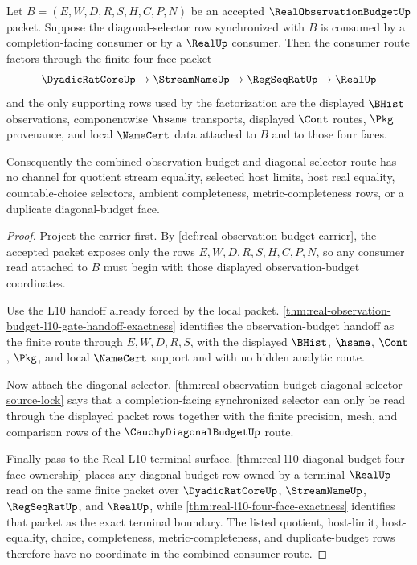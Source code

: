 \begin{theorem}
\label{thm:real-observation-budget-l10-four-face-pullback}
Let $B=(E,W,D,R,S,H,C,P,N)$ be an accepted $\RealObservationBudgetUp$ packet. Suppose the diagonal-selector row synchronized with $B$ is consumed by a completion-facing consumer or by a $\RealUp$ consumer. Then the consumer route factors through the finite four-face packet
$$
\DyadicRatCoreUp \to \StreamNameUp \to \RegSeqRatUp \to \RealUp
$$
and the only supporting rows used by the factorization are the displayed $\BHist$ observations, componentwise $\hsame$ transports, displayed $\Cont$ routes, $\Pkg$ provenance, and local $\NameCert$ data attached to $B$ and to those four faces.

Consequently the combined observation-budget and diagonal-selector route has no channel for quotient stream equality, selected host limits, host real equality, countable-choice selectors, ambient completeness, metric-completeness rows, or a duplicate diagonal-budget face.
\end{theorem}
\begin{proof}
Project the carrier first. By \autoref{def:real-observation-budget-carrier}, the accepted packet exposes only the rows $E,W,D,R,S,H,C,P,N$, so any consumer read attached to $B$ must begin with those displayed observation-budget coordinates.

Use the L10 handoff already forced by the local packet. \autoref{thm:real-observation-budget-l10-gate-handoff-exactness} identifies the observation-budget handoff as the finite route through $E,W,D,R,S$, with the displayed $\BHist$, $\hsame$, $\Cont$, $\Pkg$, and local $\NameCert$ support and with no hidden analytic route.

Now attach the diagonal selector. \autoref{thm:real-observation-budget-diagonal-selector-source-lock} says that a completion-facing synchronized selector can only be read through the displayed packet rows together with the finite precision, mesh, and comparison rows of the $\CauchyDiagonalBudgetUp$ route.

Finally pass to the Real L10 terminal surface. \autoref{thm:real-l10-diagonal-budget-four-face-ownership} places any diagonal-budget row owned by a terminal $\RealUp$ read on the same finite packet over $\DyadicRatCoreUp$, $\StreamNameUp$, $\RegSeqRatUp$, and $\RealUp$, while \autoref{thm:real-l10-four-face-exactness} identifies that packet as the exact terminal boundary. The listed quotient, host-limit, host-equality, choice, completeness, metric-completeness, and duplicate-budget rows therefore have no coordinate in the combined consumer route.
\end{proof}

